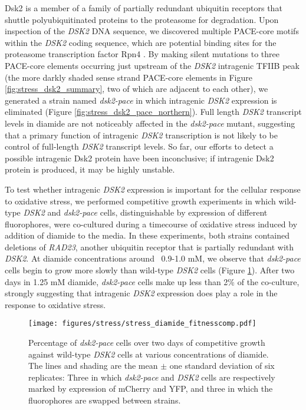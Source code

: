 Dsk2 is a member of a family of partially redundant ubiquitin receptors that shuttle polyubiquitinated proteins to the proteasome for degradation.
Upon inspection of the \textit{DSK2} DNA sequence, we discovered multiple PACE-core motifs within the \textit{DSK2} coding sequence, which are potential binding sites for the proteasome transcription factor Rpn4 \citep{shirozu2015}.
By making silent mutations to three PACE-core elements occurring just upstream of the \textit{DSK2} intragenic TFIIB peak (the more darkly shaded sense strand PACE-core elements in Figure \ref{fig:stress_dsk2_summary}, two of which are adjacent to each other), we generated a strain named \textit{dsk2-pace} in which intragenic \textit{DSK2} expression is eliminated (Figure \ref{fig:stress_dsk2_pace_northern}).
Full length \textit{DSK2} transcript levels in diamide are not noticeably affected in the \textit{dsk2-pace} mutant, suggesting that a primary function of intragenic \textit{DSK2} transcription is not likely to be control of full-length \textit{DSK2} transcript levels.
So far, our efforts to detect a possible intragenic Dsk2 protein have been inconclusive; if intragenic Dsk2 protein is produced, it may be highly unstable.

To test whether intragenic \textit{DSK2} expression is important for the cellular response to oxidative stress, we performed competitive growth experiments in which wild-type \textit{DSK2} and \textit{dsk2-pace} cells, distinguishable by expression of different fluorophores, were co-cultured during a timecourse of oxidative stress induced by addition of diamide to the media.
In these experiments, both strains contained deletions of \textit{RAD23}, another ubiquitin receptor that is partially redundant with \textit{DSK2}.
At diamide concentrations around ~0.9-1.0 mM, we observe that \textit{dsk2-pace} cells begin to grow more slowly than wild-type \textit{DSK2} cells (Figure \ref{fig:stress_diamide_fitnesscomp}).
After two days in 1.25 mM diamide, \textit{dsk2-pace} cells make up less than 2\% of the co-culture, strongly suggesting that intragenic \textit{DSK2} expression does play a role in the response to oxidative stress.

\begin{figure}[h]
    \texttt{[image: figures/stress/stress\_diamide\_fitnesscomp.pdf]}
    \caption[Percentage of \textit{dsk2-pace} cells over two days of competitive growth against wild-type \textit{DSK2} cells at various concentrations of diamide.]{Percentage of \textit{dsk2-pace} cells over two days of competitive growth against wild-type \textit{DSK2} cells at various concentrations of diamide. The lines and shading are the mean $\pm$ one standard deviation of six replicates: Three in which \textit{dsk2-pace} and \textit{DSK2} cells are respectively marked by expression of mCherry and YFP, and three in which the fluorophores are swapped between strains.}
    \label{fig:stress_diamide_fitnesscomp}
\end{figure}


